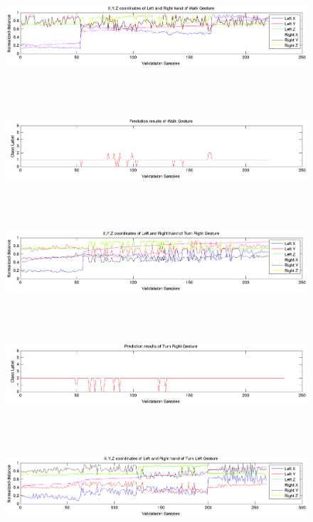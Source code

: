 \begin{figure}	
	\hspace{-15 mm} 
	\includegraphics[height=37mm]{figures/result/test-axis-walk.png} 
\end{figure}
\begin{figure}
	\hspace{-15 mm} 
	\includegraphics[height=37mm]{figures/result/test-prediction-walk.png} 
\end{figure}
\begin{figure}
	\hspace{-15 mm} 
	\includegraphics[height=37mm]{figures/result/test-axis-turn-right.png} 
\end{figure}
\begin{figure}
	\hspace{-15 mm} 
	\includegraphics[height=37mm]{figures/result/test-prediction-turn-right.png} 
\end{figure}
\begin{figure}
	\hspace{-15 mm} 
	\includegraphics[height=37mm]{figures/result/test-axis-turn-left.png} 
\end{figure}
